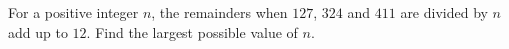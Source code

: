 For a positive integer $n$, the remainders when $127$, $324$ and $411$ are divided by $n$ add up to $12$. Find the largest possible value of $n$.
